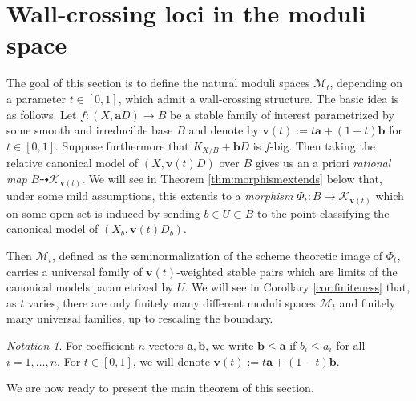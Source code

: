 \documentclass[11pt]{amsart}
\theoremstyle{definition}
\theoremstyle{remark}
\newtheorem{notation}[theorem]{Notation}
\newcommand{\sK}{\mathscr{K}}
\newcommand{\sM}{\mathscr{M}}
\newcommand{\bfa}{\mathbf{a}}
\newcommand{\bfv}{\mathbf{v}}
\newcommand{\bfb}{\mathbf{b}}
\begin{document}
	
	
	\section{Wall-crossing loci in the moduli space}\label{sec:themodulispaces}
	
	The goal of this section is to define the natural moduli spaces $\sM_t$, depending on a parameter $t \in [0,1]$, which admit a wall-crossing structure. The basic idea is as follows. Let $f : (X, \bfa D) \to B$ be a stable family of interest parametrized by some smooth and irreducible base $B$ and denote by $\bfv(t) := t\bfa + (1-t)\bfb$ for $t \in [0,1]$. Suppose furthermore that $K_{X/B} + \bfb D$ is $f$-big. Then taking the relative canonical model of $(X, \bfv(t)D)$ over $B$ gives us an a priori \emph{rational map} $B \dashrightarrow \sK_{\bfv(t)}$. We will see in Theorem \ref{thm:morphismextends} below that, under some mild assumptions, this extends to a \emph{morphism} $\Phi_t : B \to \sK_{\bfv(t)}$ which on some open set is induced by sending $b \in U \subset B$ to the point classifying the canonical model of $(X_b, \bfv(t)D_b)$. 
	
	Then $\sM_t$, defined as the seminormalization of the scheme theoretic image of $\Phi_t$, carries a universal family of $\bfv(t)$-weighted stable pairs which are limits of the canonical models parametrized by $U$. We will see in Corollary \ref{cor:finiteness} that, as $t$ varies, there are only finitely many different moduli spaces $\sM_t$ and finitely many universal families, up to rescaling the boundary. 
	
	
	
	\enspace 
	
	
	
	\begin{notation}\label{notation:ab} For coefficient $n$-vectors $\bfa, \bfb$, we write $\bfb \le \bfa$ if $b_i \le a_i$ for all $i = 1, \ldots, n$. For $t \in [0,1]$, we will denote $\bfv(t):= t\bfa + (1-t)\bfb$. 
	\end{notation}
	
	We are now ready to present the main theorem of this section.
	
\end{document}
